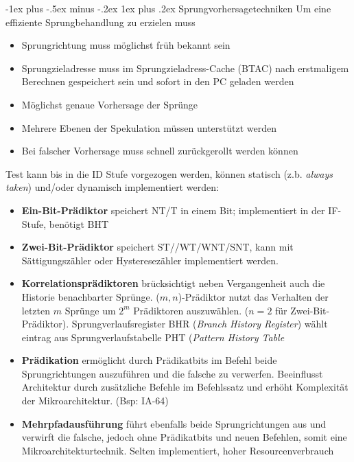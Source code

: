 \documentclass[9pt,a4paper]{scrartcl}
\makeatletter
\renewcommand{\subsubsection}{\@startsection{subsubsection}{3}{0mm}%
                                {-1ex plus -.5ex minus -.2ex}%
                                {1ex plus .2ex}%
                                {\normalfont\small\bfseries}}
\newcommand{\compactlist}{\setlength{\itemsep}{-1pt} \setlength{\parskip}{3pt} \setlength{\leftskip}{-1.5em}}
\makeatother
\begin{document}
\begin{multicols}{2}
\subsubsection{Sprungvorhersagetechniken}
Um eine effiziente Sprungbehandlung zu erzielen muss
\begin{itemize}
\compactlist
\item{Sprungrichtung muss möglichst früh bekannt sein}
\item{Sprungzieladresse muss im Sprungzieladress-Cache (BTAC) nach erstmaligem Berechnen gespeichert sein und sofort in den PC geladen werden}
\item{Möglichst genaue Vorhersage der Sprünge}
\item{Mehrere Ebenen der Spekulation müssen unterstützt werden}
\item{Bei falscher Vorhersage muss schnell zurückgerollt werden können}
\end{itemize}

Test kann bis in die ID Stufe vorgezogen werden, können statisch (z.b. \emph{always taken}) und/oder dynamisch implementiert werden:

\begin{itemize}
\compactlist
\item{\textbf{Ein-Bit-Prädiktor} speichert NT/T in einem Bit; implementiert in der IF-Stufe, benötigt BHT}
\item{\textbf{Zwei-Bit-Prädiktor} speichert ST//WT/WNT/SNT, kann mit Sättigungszähler oder Hysteresezähler implementiert werden.}
\item{\textbf{Korrelationsprädiktoren} brücksichtigt neben Vergangenheit auch die Historie benachbarter Sprünge. ($m,n$)-Prädiktor nutzt das Verhalten der letzten $m$ Sprünge um $2^m$ Prädiktoren auszuwählen. ($n=2$ für Zwei-Bit-Prädiktor). Sprungverlaufsregister BHR (\emph{Branch History Register}) wählt eintrag aus Sprungverlaufstabelle PHT (\emph{Pattern History Table}}
\item{\textbf{Prädikation} ermöglicht durch Prädikatbits im Befehl beide Sprungrichtungen auszuführen und die falsche zu verwerfen. Beeinflusst Architektur durch zusätzliche Befehle im Befehlssatz und erhöht Komplexität der Mikroarchitektur. (Bsp: IA-64)}
\item{\textbf{Mehrpfadausführung} führt ebenfalls beide Sprungrichtungen aus und verwirft die falsche, jedoch ohne Prädikatbits und neuen Befehlen, somit eine Mikroarchitekturtechnik. Selten implementiert, hoher Resourcenverbrauch}
\end{itemize}


\end{multicols}
\end{document}
